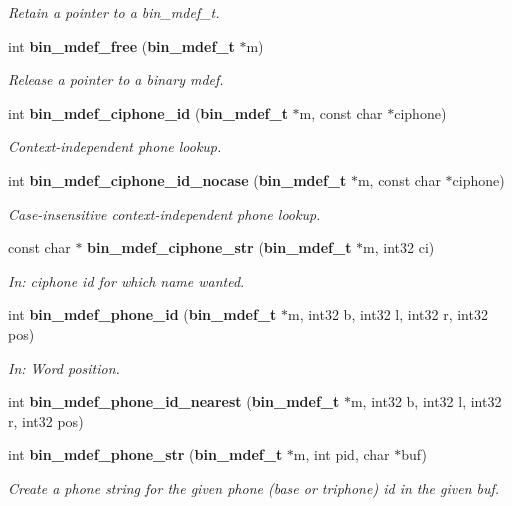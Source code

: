 \begin{DoxyCompactItemize}
\begin{DoxyCompactList}\small\item\em Retain a pointer to a bin\+\_\+mdef\+\_\+t. \end{DoxyCompactList}\item 
int {\bf bin\+\_\+mdef\+\_\+free} ({\bf bin\+\_\+mdef\+\_\+t} $\ast$m)\label{bin__mdef_8h_afe7ed87e2a2d22b228c14ed8225e4b2c}

\begin{DoxyCompactList}\small\item\em Release a pointer to a binary mdef. \end{DoxyCompactList}\item 
int {\bf bin\+\_\+mdef\+\_\+ciphone\+\_\+id} ({\bf bin\+\_\+mdef\+\_\+t} $\ast$m, const char $\ast$ciphone)
\begin{DoxyCompactList}\small\item\em Context-\/independent phone lookup. \end{DoxyCompactList}\item 
int {\bf bin\+\_\+mdef\+\_\+ciphone\+\_\+id\+\_\+nocase} ({\bf bin\+\_\+mdef\+\_\+t} $\ast$m, const char $\ast$ciphone)
\begin{DoxyCompactList}\small\item\em Case-\/insensitive context-\/independent phone lookup. \end{DoxyCompactList}\item 
const char $\ast$ {\bf bin\+\_\+mdef\+\_\+ciphone\+\_\+str} ({\bf bin\+\_\+mdef\+\_\+t} $\ast$m, int32 ci)
\begin{DoxyCompactList}\small\item\em In\+: ciphone id for which name wanted. \end{DoxyCompactList}\item 
int {\bf bin\+\_\+mdef\+\_\+phone\+\_\+id} ({\bf bin\+\_\+mdef\+\_\+t} $\ast$m, int32 b, int32 l, int32 r, int32 pos)
\begin{DoxyCompactList}\small\item\em In\+: Word position. \end{DoxyCompactList}\item 
int {\bfseries bin\+\_\+mdef\+\_\+phone\+\_\+id\+\_\+nearest} ({\bf bin\+\_\+mdef\+\_\+t} $\ast$m, int32 b, int32 l, int32 r, int32 pos)\label{bin__mdef_8h_a155bcd77cd4cd26d15c857b999a1fdae}

\item 
int {\bf bin\+\_\+mdef\+\_\+phone\+\_\+str} ({\bf bin\+\_\+mdef\+\_\+t} $\ast$m, int pid, char $\ast$buf)
\begin{DoxyCompactList}\small\item\em Create a phone string for the given phone (base or triphone) id in the given buf. \end{DoxyCompactList}\end{DoxyCompactItemize}
